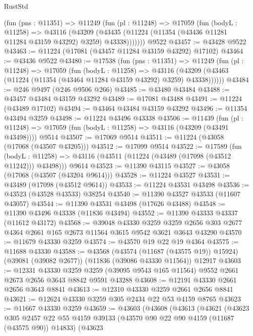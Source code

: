 \begin{lexlean}{RustStd}
\begin{coremodule}
      (fun (pns : @11351) =>
      @11249
        (fun (pl : @11248) =>
        @17059
          (fun (bodyL : @11258) =>
          @43116
            (@43209
              (@43435 (@11224 (@11354 (@43436 @11281 @11284 @43159 @43292) @3259) @43338)))))))
    @9522
@43457 := @43428 @9522
@43463 := @11224 (@17081 (@43457 @11284 @43159 @43292) @17102)
@43464 := @43436 @9522
@43480 := @17538
    (fun (pns : @11351) =>
    @11249
      (fun (pl : @11248) =>
      @17059
        (fun (bodyL : @11258) =>
        @43116 (@43209 (@43463 (@11224 (@11354 (@43464 @11284 @43159 @43292) @3259) @43338))))))
@43484 := @246 @9497 (@246 @9506 @266)
@43485 := @43480 @43484
@43488 := @43457 @43484 @43159 @43292
@43489 := @17081 @43488
@43491 := @11224 (@43489 @17102)
@43494 := @43464 @43484 @43159 @43292
@43496 := @11354 @43494 @3259
@43498 := @11224 @43496 @43338
@43506 := @11439
    (fun (pl : @11248) => @17059 (fun (bodyL : @11258) => @43116 (@43209 (@43491 @43498))))
    @9514
@43507 := @17069 @9514
@43511 := @11224 (@43058 (@17068 (@43507 @43205)))
@43512 := @17099 @9514
@43522 := @17589
    (fun (bodyL : @11258) => @43116 (@43511 (@11224 (@43489 (@17098 (@43512 @11242))) @43498)))
    @9614
@43523 := @11390 @43115
@43527 := @43058 (@17068 (@43507 (@43204 @9614)))
@43528 := @11224 @43527
@43531 := @43489 (@17098 (@43512 @9614))
@43533 := @11224 @43531 @43498
@43536 := @43523 (@43528 @43533) @38254
@43540 := @11390 @43527 @43533 (@11607 @43057)
@43544 := @11390 @43531 @43498 (@17626 @43488)
@43548 := @11390 @43496 @43338 (@11836 @43494)
@43552 := @11390 @43333 @43337 (@11612 @43172)
@43568 := @39048
    @43330
    @3259
    @3259
    @2656
    @303
    @2677
    @4364
    @2661
    @165
    @2673
    @11564
    @3615
    @9542
    @3621
    @3643
    @43290
@43570 := @11679 @43330 @3259
@43574 := @43570 @19 @22 @19 @4364
@43575 := @11688 @43330
@43588 := @43568
    (@43574 (@11687 (@43575 @19)) @15924)
    (@39081 (@39082 @2677))
    (@11836 (@39086 @43330 @11564))
    @12917
@43603 := @12331
    @43330
    @3259
    @3259
    (@39095 @9543 @165 @11564)
    @9552
    @2661
    @2673
    @2656
    @3643
    @8842
    @9591
    @43288
@43608 := @12191 @43330 @2661 @2656 @3643 @8841
@43613 := @12310 @43330 @3259 @2661 @2656 @8841
@43621 := @12624 @43330 @3259 @305 @2434 @22 @53 @4159 @8765
@43623 := @11667 @43330 @3259
@43659 := @43603
    (@43608
      (@43613
        (@43621
          (@43623
            @305
            @2457
            @22
            @55
            @4159
            @39133
            (@43570 @90 @22 @90 @4159 (@11687 (@43575 @90)) @14833)
            (@43623

\end{coremodule}
\end{lexlean}
